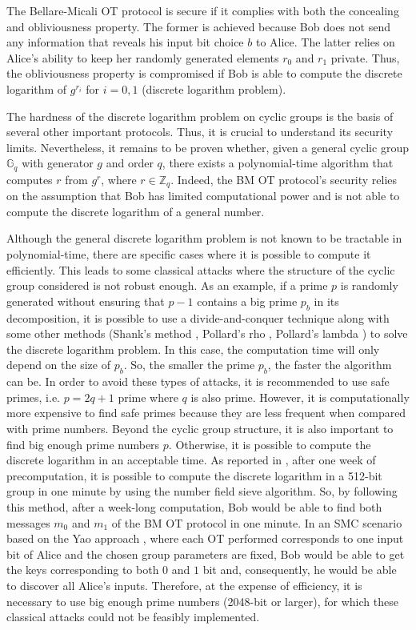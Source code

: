 The Bellare-Micali OT protocol is secure if it complies with both the concealing and obliviousness property. The former is achieved because Bob does not send any information that reveals his input bit choice $b$ to Alice. The latter relies on Alice's ability to keep her randomly generated elements $r_0$ and $r_1$ private. Thus, the obliviousness property is compromised if Bob is able to compute the discrete logarithm of $g^{r_i}$ for $i=0,1$ (discrete logarithm problem).

The hardness of the discrete logarithm problem on cyclic groups is the basis of several other important protocols. Thus, it is crucial to understand its security limits. Nevertheless, it remains to be proven whether, given a general cyclic group $ \mathbb{G}_q$ with generator $g$ and order $q$, there exists a polynomial-time algorithm that computes $r$ from $g^r$, where $r\in \mathbb{Z}_q$. Indeed, the BM OT protocol's security relies on the assumption that Bob has limited computational power and is not able to compute the discrete logarithm of a general number.

Although the general discrete logarithm problem is not known to be tractable in polynomial-time, there are specific cases where it is possible to compute it efficiently. This leads to some classical attacks where the structure of the cyclic group considered is not robust enough. As an example, if a prime $p$ is randomly generated without ensuring that $p - 1$ contains a big prime $p_b$ in its decomposition, it is possible to use a divide-and-conquer technique \cite{PH78} along with some other methods (Shank's method \cite{S71}, Pollard's rho \cite{P78}, Pollard's lambda  \cite{P78}) to solve the discrete logarithm problem. In this case, the computation time will only depend on the size of $p_b$. So, the smaller the prime $p_b$, the faster the algorithm can be. In order to avoid these types of attacks, it is recommended to use safe primes, i.e. $p = 2q + 1$ prime where $q$ is also prime. However, it is computationally more expensive to find safe primes because they are less frequent when compared with prime numbers. Beyond the cyclic group structure, it is also important to find big enough prime numbers $p$. Otherwise, it is possible to compute the discrete logarithm in an acceptable time. As reported in \cite{ABDGGHHSTVVWZZ15}, after one week of precomputation, it is possible to compute the discrete logarithm in a 512-bit group in one minute by using the number field sieve algorithm. So, by following this method, after a week-long computation, Bob would be able to find both messages $m_0$ and $m_1$ of the BM OT protocol in one minute. In an SMC scenario based on the Yao approach \cite{Yao82}, where each OT performed corresponds to one input bit of Alice and the chosen group parameters are fixed, Bob would be able to get the keys corresponding to both $0$ and $1$ bit and, consequently, he would be able to discover all Alice's inputs. Therefore, at the expense of efficiency, it is necessary to use big enough prime numbers (2048-bit or larger), for which these classical attacks could not be feasibly implemented.

